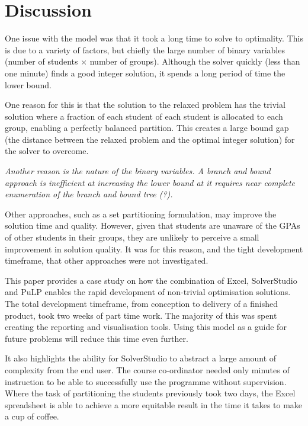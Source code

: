 \documentclass[12pt]{ORSNZ}
\begin{document}
\section{Discussion}

One issue with the model was that it took a long time to solve to optimality. This is due to a variety of factors, but chiefly the large number of binary variables (number of students $\times$ number of groups). Although the solver quickly (less than one minute) finds a good integer solution, it spends a long period of time the lower bound.

One reason for this is that the solution to the relaxed problem has the trivial solution where a fraction of each student of each student is allocated to each group, enabling a perfectly balanced partition. This creates a large bound gap (the distance between the relaxed problem and the optimal integer solution) for the solver to overcome.

\emph{Another reason is the nature of the binary variables. A branch and bound approach is inefficient at increasing the lower bound at it requires near complete enumeration of the branch and bound tree (?).}


Other approaches, such as a set partitioning formulation, may improve the solution time and quality. However, given that students are unaware of the GPAs of other students in their groups, they are unlikely to perceive a small improvement in solution quality. It was for this reason, and the tight development timeframe, that other approaches were not investigated.



This paper provides a case study on how the combination of Excel, SolverStudio and PuLP enables the rapid development of non-trivial optimisation solutions. The total development timeframe, from conception to delivery of a finished product, took two weeks of part time work. The majority of this was spent creating the reporting and visualisation tools. Using this model as a guide for future problems will reduce this time even further.

It also highlights the ability for SolverStudio to abstract a large amount of complexity from the end user. The course co-ordinator needed only minutes of instruction to be able to successfully use the programme without supervision. Where the task of partitioning the students previously took two days, the Excel spreadsheet is able to achieve a more equitable result in the time it takes to make a cup of coffee.
\end{document}
